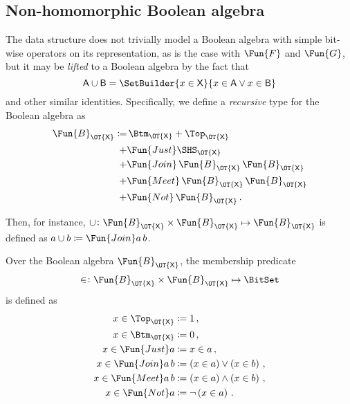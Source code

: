 \documentclass[ ../main.tex]{subfiles}
\begin{document}
\subsection{Non-homomorphic Boolean algebra}
The data structure does not trivially model a Boolean algebra with simple bit-wise operators on its representation, as is the case with $\Fun{F}$ and $\Fun{G}$, but it may be \emph{lifted} to a Boolean algebra by the fact that
\begin{equation}
\Set{A} \SetUnion \Set{B} = \SetBuilder{x \in {\Set{X}}}{x \in \Set{A} \lor x \in \Set{B}}
\end{equation}
and other similar identities.
Specifically, we define a \emph{recursive} type for the Boolean algebra as
\begin{align}
\Fun{B}_{\OT{\Set{X}}} \coloneqq & \, \Btm_{\OT{\Set{X}}} + \Top_{\OT{\Set{X}}} \\
+ & \Fun{Just} \SHS_{\OT{\Set{X}}} \\
+ & \Fun{Join} \, \Fun{B}_{\OT{\Set{X}}} \, \Fun{B}_{\OT{\Set{X}}} \\
+ & \Fun{Meet} \, \Fun{B}_{\OT{\Set{X}}} \, \Fun{B}_{\OT{\Set{X}}} \\
+ & \Fun{Not}  \, \Fun{B}_{\OT{\Set{X}}} \,.
\end{align}

Then, for instance, $\SetUnion \colon \Fun{B}_{\OT{\Set{X}}} \times \Fun{B}_{\OT{\Set{X}}} \mapsto \Fun{B}_{\OT{\Set{X}}}$ is defined as $a \SetUnion b \coloneqq \Fun{Join} a \, b$.

Over the Boolean algebra $\Fun{B}_{\OT{\Set{X}}}$, the membership predicate
\begin{equation}
\SetContains \colon \Fun{B}_{\OT{\Set{X}}} \times \Fun{B}_{\OT{\Set{X}}} \mapsto \BitSet
\end{equation}
is defined as
\begin{align}
x \SetContains \Top_{\OT{\Set{X}}} 	& \coloneqq 1\,,\\
x \SetContains \Btm_{\OT{\Set{X}}} 	& \coloneqq 0\,,\\	
x \SetContains \Fun{Just} a		   	& \coloneqq x \SetContains a\,,\\
x \SetContains \Fun{Join} a \, b 	& \coloneqq \left(x \SetContains a\right) \lor
\left(x \SetContains b\right)\,,\\
x \SetContains \Fun{Meet} a \, b 	& \coloneqq \left(x \SetContains a\right) \land
\left(x \SetContains b\right)\,,\\
x \SetContains \Fun{Not} a		 	& \coloneqq \neg \left(x \SetContains a\right)\,.
\end{align}
\end{document}
